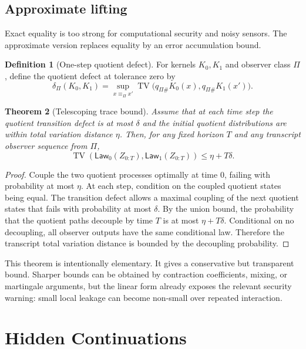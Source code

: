 \documentclass[11pt]{article}
\theoremstyle{definition}
\newtheorem{definition}{Definition}[section]
\theoremstyle{plain}
\newtheorem{theorem}[definition]{Theorem}
\theoremstyle{remark}
\DeclareMathOperator{\TV}{TV}
\newcommand{\eqobs}{\equiv_{\Pi}}
\begin{document}
\subsection{Approximate lifting}

Exact equality is too strong for computational security and noisy sensors. The approximate version replaces equality by an error accumulation bound.

\begin{definition}[One-step quotient defect]
For kernels $K_0,K_1$ and observer class $\Pi$, define the quotient defect at tolerance zero by
\[
    \delta_{\Pi}(K_0,K_1)=\sup_{x\eqobs x'}\TV\big(q_{\Pi\#}K_0(x),q_{\Pi\#}K_1(x')\big).
\]
\end{definition}

\begin{theorem}[Telescoping trace bound]
Assume that at each time step the quotient transition defect is at most $\delta$ and the initial quotient distributions are within total variation distance $\eta$. Then, for any fixed horizon $T$ and any transcript observer sequence from $\Pi$,
\[
    \TV(\mathsf{Law}_0(Z_{0:T}),\mathsf{Law}_1(Z_{0:T}))\le \eta + T\delta.
\]
\end{theorem}

\begin{proof}
Couple the two quotient processes optimally at time $0$, failing with probability at most $\eta$. At each step, condition on the coupled quotient states being equal. The transition defect allows a maximal coupling of the next quotient states that fails with probability at most $\delta$. By the union bound, the probability that the quotient paths decouple by time $T$ is at most $\eta+T\delta$. Conditional on no decoupling, all observer outputs have the same conditional law. Therefore the transcript total variation distance is bounded by the decoupling probability.
\end{proof}

This theorem is intentionally elementary. It gives a conservative but transparent bound. Sharper bounds can be obtained by contraction coefficients, mixing, or martingale arguments, but the linear form already exposes the relevant security warning: small local leakage can become non-small over repeated interaction.

\section{Hidden Continuations}
\end{document}
